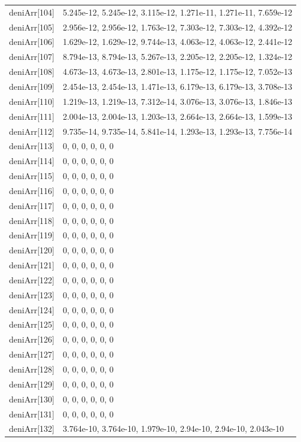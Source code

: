 {\begin{longtable}{p{}p{}}
{}deniArr[104] & 5.245e-12, 5.245e-12, 3.115e-12, 1.271e-11, 1.271e-11, 7.659e-12\\
{}deniArr[105] & 2.956e-12, 2.956e-12, 1.763e-12, 7.303e-12, 7.303e-12, 4.392e-12\\
{}deniArr[106] & 1.629e-12, 1.629e-12, 9.744e-13, 4.063e-12, 4.063e-12, 2.441e-12\\
{}deniArr[107] & 8.794e-13, 8.794e-13, 5.267e-13, 2.205e-12, 2.205e-12, 1.324e-12\\
{}deniArr[108] & 4.673e-13, 4.673e-13, 2.801e-13, 1.175e-12, 1.175e-12, 7.052e-13\\
{}deniArr[109] & 2.454e-13, 2.454e-13, 1.471e-13, 6.179e-13, 6.179e-13, 3.708e-13\\
{}deniArr[110] & 1.219e-13, 1.219e-13, 7.312e-14, 3.076e-13, 3.076e-13, 1.846e-13\\
{}deniArr[111] & 2.004e-13, 2.004e-13, 1.203e-13, 2.664e-13, 2.664e-13, 1.599e-13\\
{}deniArr[112] & 9.735e-14, 9.735e-14, 5.841e-14, 1.293e-13, 1.293e-13, 7.756e-14\\
{}deniArr[113] & 0, 0, 0, 0, 0, 0\\
{}deniArr[114] & 0, 0, 0, 0, 0, 0\\
{}deniArr[115] & 0, 0, 0, 0, 0, 0\\
{}deniArr[116] & 0, 0, 0, 0, 0, 0\\
{}deniArr[117] & 0, 0, 0, 0, 0, 0\\
{}deniArr[118] & 0, 0, 0, 0, 0, 0\\
{}deniArr[119] & 0, 0, 0, 0, 0, 0\\
{}deniArr[120] & 0, 0, 0, 0, 0, 0\\
{}deniArr[121] & 0, 0, 0, 0, 0, 0\\
{}deniArr[122] & 0, 0, 0, 0, 0, 0\\
{}deniArr[123] & 0, 0, 0, 0, 0, 0\\
{}deniArr[124] & 0, 0, 0, 0, 0, 0\\
{}deniArr[125] & 0, 0, 0, 0, 0, 0\\
{}deniArr[126] & 0, 0, 0, 0, 0, 0\\
{}deniArr[127] & 0, 0, 0, 0, 0, 0\\
{}deniArr[128] & 0, 0, 0, 0, 0, 0\\
{}deniArr[129] & 0, 0, 0, 0, 0, 0\\
{}deniArr[130] & 0, 0, 0, 0, 0, 0\\
{}deniArr[131] & 0, 0, 0, 0, 0, 0\\
{}deniArr[132] & 3.764e-10, 3.764e-10, 1.979e-10, 2.94e-10, 2.94e-10, 2.043e-10\\

\end{longtable}}
